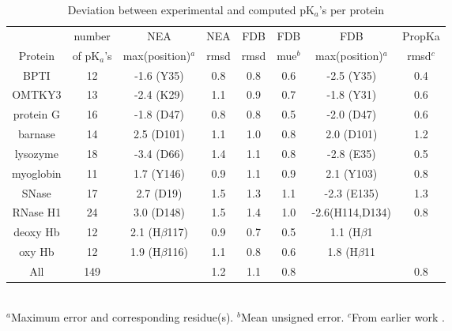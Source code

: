 \documentclass[a4paper,12pt]{article}
\newcommand{\pk}{pK$_a$}
\begin{document}
\begin{table}[h]
\caption{Deviation between experimental and computed \pk's per protein} \label{tab:perrors}
\begin{center} \small
\begin{tabular}{cccccccc} \hline
          & number   &  NEA                &  NEA   &  FDB    & FDB & FDB              & PropKa   \\
Protein   & of \pk's & max(position)$^a$   & rmsd   & rmsd    & mue$^b$ & max(position)$^a$ & rmsd$^c$ \\ \hline
BPTI	  & 12	     &  -1.6  (Y35) 	   &  0.8   &   0.8   & 0.6 &  -2.5 (Y35) 	  & 0.4 \\
OMTKY3    & 13	     &  -2.4  (K29)	   &  1.1   &   0.9   & 0.7 &  -1.8 (Y31) 	  & 0.6 \\
protein G & 16	     &  -1.8  (D47) 	   &  0.8   &   0.8   & 0.5 &  -2.0 (D47) 	  & 0.6 \\
barnase   & 14	     &   2.5  (D101) 	   &  1.1   &   1.0   & 0.8 &   2.0 (D101)	  & 1.2 \\
lysozyme  & 18	     &  -3.4  (D66) 	   &  1.4   &   1.1   & 0.8 &  -2.8 (E35) 	  & 0.5 \\
myoglobin & 11	     &   1.7  (Y146) 	   &  0.9   &   1.1   & 0.9 &   2.1 (Y103)	  & 0.8 \\
SNase     & 17	     &   2.7  (D19)        &  1.5   &   1.3   & 1.1 &  -2.3 (E135)      & 1.3 \\
RNase H1  & 24	     &   3.0  (D148)       &  1.5   &   1.4   & 1.0 &  -2.6(H114,D134)  & 0.8 \\
deoxy Hb  & 12	     &   2.1 (H$\beta$117) &  0.9   &   0.7   & 0.5 &   1.1 (H$\beta$1  &     \\
oxy Hb    & 12	     &   1.9 (H$\beta$116) &  1.1   &   0.8   & 0.6 &   1.8 (H$\beta$11 &     \\ \hline 
All	  & 149      &	                   &  1.2   &   1.1   & 0.8 &                   & 0.8 \\ \hline
\end{tabular}                                                                                   	
\\ {\footnotesize \noindent $^a$Maximum error and corresponding residue(s). $^b$Mean unsigned error.
  $^c$From earlier work \cite{Polydorides13}.}
\end{center}
\end{table}
\end{document}
